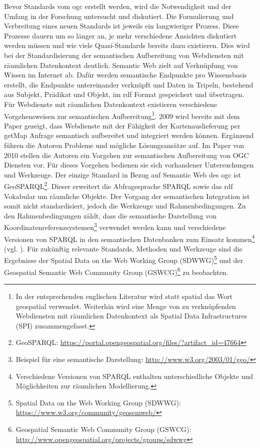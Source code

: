 Bevor Standards vom \Gls{ogc} erstellt werden, wird die Notwendigkeit und der Umfang in der Forschung untersucht und diskutiert.
Die Formulierung und Verbreitung eines neuen Standards ist jeweils ein langwieriger Prozess.
Diese Prozesse dauern um so länger an, je mehr verschiedene Ansichten diskutiert werden müssen und wie viele Quasi-Standards bereits dazu existieren.
Dies wird bei der Standardisierung der semantischen Aufbereitung von Webdiensten mit räumlichen Datenkontext deutlich.
Semantic Web zielt auf Verknüpfung von Wissen im Internet ab.
Dafür werden semantische Endpunkte pro Wissensbasis erstellt, die Endpunkte untereinander verknüpft und Daten in Tripeln, bestehend aus Subjekt, Prädikat und Objekt, im \Gls{rdf} Format gespeichert und übertragen.
Für Webdienste mit räumlichen Datenkontext existieren verschiedene Vorgehensweisen zur semantischen Aufbereitung\footnote{In der entsprechenden englischen Literatur wird statt spatial das Wort geospatial verwendet. Weiterhin wird eine Menge von zu verknüpfenden Webdiensten mit räumlichen Datenkontext als Spatial Data Infrastructures (SPI) zusammengefasst.}.
2009 wird bereits mit dem Paper \cite{report:semgeospatinte} gezeigt, dass Webdienste mit der Fähigkeit der Kartenauslieferung per \glqq{}getMap\grqq{} Anfrage semantisch aufbereitet und integriert werden können.
Ergänzend führen die Autoren Probleme und mögliche Lösungsansätze auf.
Im Paper \cite{report:semenspa} von 2010 stellen die Autoren ein Vorgehen zur semantischen Aufbereitung von OGC Diensten vor.
Für dieses Vorgehen bedienen sie sich vorhandener Untersuchungen und Werkzeuge.
Der einzige Standard in Bezug auf Semantic Web des \Gls{ogc} ist GeoSPARQL\footnote{GeoSPARQL: \url{https://portal.opengeospatial.org/files/?artifact_id=47664}}.
Dieser erweitert die Abfragesprache SPARQL sowie das \Gls{rdf} Vokabular um räumliche Objekte.
Der Vorgang der semantischen Integration ist somit nicht standardisiert, jedoch die Werkzeuge und Rahmenbedingungen.
Zu den Rahmenbedingungen zählt, dass die semantische Darstellung von Koordinatenreferenzsystemen\footnote{Beispiel für eine semantische Darstellung: \url{http://www.w3.org/2003/01/geo/}} verwendet werden kann und verschiedene Versionen von SPARQL in den semantischen Datenbanken zum Einsatz kommen\footnote{Verschiedene Versionen von SPARQL enthalten unterschiedliche Objekte und Möglichkeiten zur räumlichen Modellierung.} (vgl. \cite[S.5]{book:semgeosparql}).
Für zukünftig relevante Standards, Methoden und Werkzeuge sind die Ergebnisse der Spatial Data on the Web Working Group (SDWWG)\footnote{Spatial Data on the Web Working Group (SDWWG): \url{https://www.w3.org/community/geosemweb/}} und der Geospatial Semantic Web Community Group (GSWCG)\footnote{Geospatial Semantic Web Community Group (GSWCG): \url{http://www.opengeospatial.org/projects/groups/sdwwg}} zu beobachten. 


